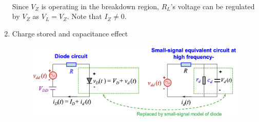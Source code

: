 \begin{enumerate}
\begin{figure}[h]
    \end{figure}\\
    Since $V_Z$ is operating in the breakdown region, $R_L$'s voltage can be regulated by $V_Z$ as $V_L=V_Z$. Note that $I_Z \neq 0$.
    \item Charge stored and capacitance effect
    \begin{figure}[h]
        \centering
        \includegraphics[width=1\linewidth]{image/diodesmall-signal.png}
    \end{figure}
\end{enumerate}
